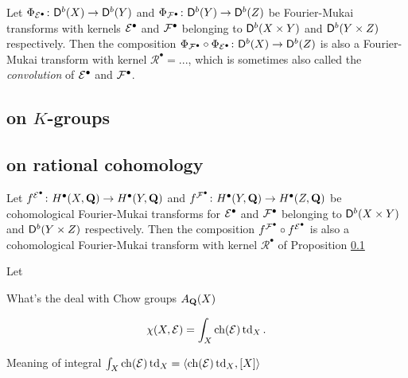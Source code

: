 \begin{proposition}
    \label{Composition of fm is fm}
    Let $\Phi_{\mathcal E^\bullet} \colon \mathsf{D}^b(X) \to \mathsf{D}^b(Y)$ and $\Phi_{\mathcal F^\bullet} \colon \mathsf{D}^b(Y) \to \mathsf{D}^b(Z)$ be Fourier-Mukai transforms with kernels $\mathcal E^\bullet$ and $\mathcal F^\bullet$ belonging to $\mathsf{D}^b(X \times Y)$ and $\mathsf{D}^b(Y \times Z)$ respectively. Then the composition $\Phi_{\mathcal F^\bullet} \circ \Phi_{\mathcal E^\bullet} \colon \mathsf{D}^b(X) \to \mathsf{D}^b(Z)$ is also a Fourier-Mukai transform with kernel $\mathcal R^\bullet = ...$, which is sometimes also called the \emph{convolution} of $\mathcal E^\bullet$ and $\mathcal F^\bullet$.
\end{proposition}

\subsection{on $K$-groups}


\subsection{on rational cohomology}
\label{Subsection: FM transform on cohomology}

\begin{proposition}
    \label{Composition of cohomological fm is fm}
    Let $f^{\mathcal E^\bullet} \colon H^\bullet(X, \mathbf Q) \to H^\bullet(Y, \mathbf Q)$ and $f^{\mathcal F^\bullet} \colon H^\bullet(Y, \mathbf Q) \to H^\bullet(Z, \mathbf Q)$ be cohomological Fourier-Mukai transforms for $\mathcal E^\bullet$ and $\mathcal F^\bullet$ belonging to $\mathsf{D}^b(X \times Y)$ and $\mathsf{D}^b(Y \times Z)$ respectively. Then the composition $f^{\mathcal F^\bullet} \circ f^{\mathcal E^\bullet}$ is also a cohomological Fourier-Mukai transform with kernel $\mathcal R^\bullet$ of Proposition \ref{}
\end{proposition}

\begin{theorem}
    \label{Grothendieck-Riemann-Roch}
    Let
\end{theorem}

\begin{remark}
    What's the deal with Chow groups $A_\mathbf Q(X)$    
\end{remark}

\begin{corollary}
    \label{Hirzebruch-Riemann-Roch}
    \[
        \chi(X, \E) = \int_X \ch{\E}\tdclass{X}.
    \]
\end{corollary}

\begin{remark}
    Meaning of integral $\int_X \ch{\E}\tdclass{X} = \pairing{\ch{\E}\tdclass{X}}{[X]}$
\end{remark}

